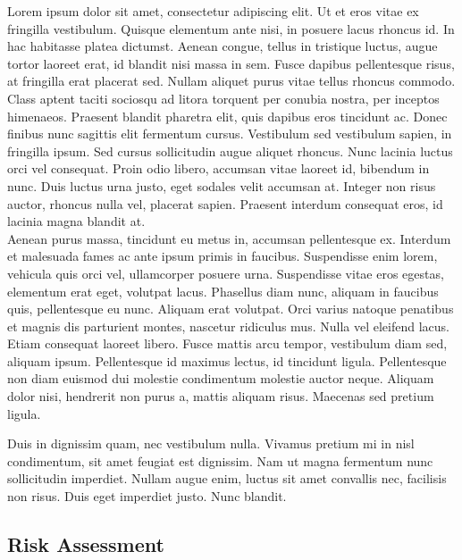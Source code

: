 Lorem ipsum dolor sit amet, consectetur adipiscing elit. Ut et eros vitae ex fringilla vestibulum. Quisque elementum ante nisi, in posuere lacus rhoncus id. In hac habitasse platea dictumst. Aenean congue, tellus in tristique luctus, augue tortor laoreet erat, id blandit nisi massa in sem. Fusce dapibus pellentesque risus, at fringilla erat placerat sed. Nullam aliquet purus vitae tellus rhoncus commodo. Class aptent taciti sociosqu ad litora torquent per conubia nostra, per inceptos himenaeos. Praesent blandit pharetra elit, quis dapibus eros tincidunt ac. Donec finibus nunc sagittis elit fermentum cursus. Vestibulum sed vestibulum sapien, in fringilla ipsum. Sed cursus sollicitudin augue aliquet rhoncus. Nunc lacinia luctus orci vel consequat. Proin odio libero, accumsan vitae laoreet id, bibendum in nunc. Duis luctus urna justo, eget sodales velit accumsan at. Integer non risus auctor, rhoncus nulla vel, placerat sapien. Praesent interdum consequat eros, id lacinia magna blandit at. \\

Aenean purus massa, tincidunt eu metus in, accumsan pellentesque ex. Interdum et malesuada fames ac ante ipsum primis in faucibus. Suspendisse enim lorem, vehicula quis orci vel, ullamcorper posuere urna. Suspendisse vitae eros egestas, elementum erat eget, volutpat lacus. Phasellus diam nunc, aliquam in faucibus quis, pellentesque eu nunc. Aliquam erat volutpat. Orci varius natoque penatibus et magnis dis parturient montes, nascetur ridiculus mus. Nulla vel eleifend lacus. Etiam consequat laoreet libero. Fusce mattis arcu tempor, vestibulum diam sed, aliquam ipsum. Pellentesque id maximus lectus, id tincidunt ligula. Pellentesque non diam euismod dui molestie condimentum molestie auctor neque. Aliquam dolor nisi, hendrerit non purus a, mattis aliquam risus. Maecenas sed pretium ligula.

Duis in dignissim quam, nec vestibulum nulla. Vivamus pretium mi in nisl condimentum, sit amet feugiat est dignissim. Nam ut magna fermentum nunc sollicitudin imperdiet. Nullam augue enim, luctus sit amet convallis nec, facilisis non risus. Duis eget imperdiet justo. Nunc blandit.

\subsection{Risk Assessment} %

